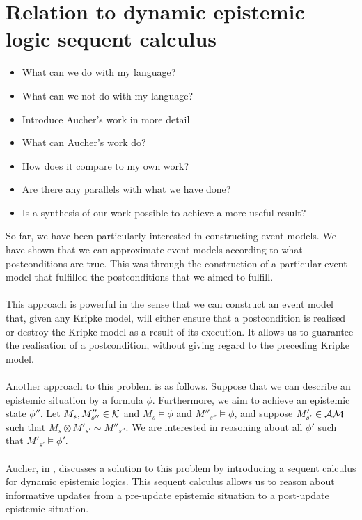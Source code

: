 \section{Relation to dynamic epistemic logic sequent calculus}
\begin{itemize}
	\item What can we do with my language?
	\item What can we not do with my language?
	\item Introduce Aucher's work in more detail
	\item What can Aucher's work do?
	\item How does it compare to my own work?
	\item Are there any parallels with what we have done?
	\item Is a synthesis of our work possible to achieve a more useful result?
\end{itemize}

So far, we have been particularly interested in constructing event models.
We have shown that we can approximate event models according to what
postconditions are true.
This was through the construction of a particular event model that fulfilled
the postconditions that we aimed to fulfill.\\
\\
This approach is powerful in the sense that we can construct an event model
that, given any Kripke model, will either ensure that a postcondition
is realised or destroy the Kripke model as a result of its execution.
It allows us to guarantee the realisation of a postcondition, without giving
regard to the preceding Kripke model.\\
\\
Another approach to this problem is as follows.
Suppose that we can describe an epistemic situation by a formula $\phi$.
Furthermore, we aim to achieve an epistemic state $\phi''$.
Let $M_s, M''_{s''} \in \mathcal{K}$ and $M_s \models \phi$ and $M''_{s''}
\models \phi$, and suppose $M'_{s'} \in \mathcal{AM}$ such that $M_s \otimes
M'_{s'} \sim M''_{s''}$.
We are interested in reasoning about all $\phi'$ such that $M'_{s'}
\models \phi'$.\\
\\
Aucher, in \FIXME, discusses a solution to this problem by introducing a
sequent calculus for dynamic epistemic logics.
This sequent calculus allows us to reason about informative updates from
a pre-update epistemic situation to a post-update epistemic situation.

